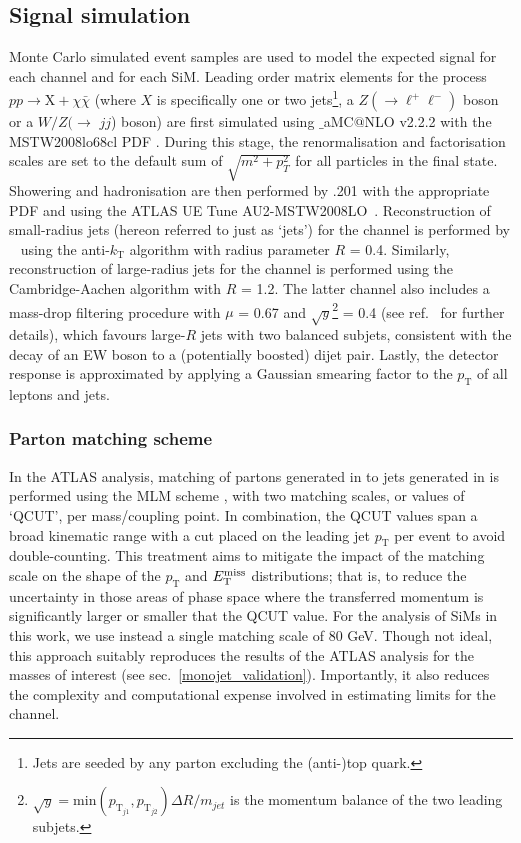 \subsection{Signal simulation}
\label{signal_generation}
Monte Carlo simulated event samples are used to model the expected signal for each channel and for each SiM. Leading order matrix elements for the process $pp \rightarrow \mathrm{X} + \chi\bar{\chi}$ (where $X$ is specifically one or two jets\footnote{Jets are seeded by any parton excluding the (anti-)top quark.}, a $Z(\rightarrow \ell^+ \ell^-)$ boson or a $W/Z(\rightarrow$ $jj$) boson) are first simulated using \MGnospace$\_$aMC$@$NLO v2.2.2 \cite{MG_aMCNLO2014} with the MSTW2008lo68cl PDF \cite{MSTW}. During this stage, the renormalisation and factorisation scales are set to the default sum of $\sqrt{m^{2} + p_{T}^{2}}$ for all particles in the final state. Showering and hadronisation are then performed by \PYTHIAnospace .201 \cite{pythia8} with the appropriate PDF and using the ATLAS UE Tune AU2-MSTW2008LO~\cite{AUtune}. Reconstruction of small-radius jets (hereon referred to just as `jets') for the \monojet channel is performed by \FASTJET~\cite{FastJet} using the anti-$k_{\mathrm{T}}$ algorithm with radius parameter $R$ = 0.4. Similarly, reconstruction of large-radius jets for the \monoWZ channel is performed using the Cambridge-Aachen algorithm with $R$ = 1.2. The latter channel also includes a mass-drop filtering procedure with $\mu$ = 0.67 and $\sqrt{y}$\footnote{$\sqrt{y} = \mathrm{min}(p_{\mathrm{T}_{j1}},p_{\mathrm{T}_{j2}})\Delta R / m_{jet}$ is the momentum balance of the two leading subjets.} = 0.4 (see ref.~\cite{massdrop} for further details), which favours large-$R$ jets with two balanced subjets, consistent with the decay of an EW boson to a (potentially boosted) dijet pair. Lastly, the detector response is approximated by applying a Gaussian smearing factor to the $p_{\mathrm{T}}$ of all leptons and jets.

\subsubsection{Parton matching scheme}
\label{matching_procedure}
In the ATLAS \monojet analysis, matching of partons generated in \MG to jets generated in \PYTHIA is performed using the MLM scheme \cite{MLMscheme}, with two matching scales, or values of `QCUT', per mass/coupling point. In combination, the QCUT values span a broad kinematic range with a cut placed on the leading jet $p_{\mathrm{T}}$ per event to avoid double-counting. This treatment aims to mitigate the impact of the matching scale on the shape of the $p_{\mathrm{T}}$ and $E_{\mathrm{T}}^{\mathrm{miss}}$ distributions; that is, to reduce the uncertainty in those areas of phase space where the transferred momentum is significantly larger or smaller that the QCUT value. For the analysis of SiMs in this work, we use instead a single matching scale of 80 GeV. Though not ideal, this approach suitably reproduces the results of the ATLAS \monojet analysis for the masses of interest (see sec.~\ref{monojet_validation}). Importantly, it also reduces the complexity and computational expense involved in estimating limits for the \monojet channel.

